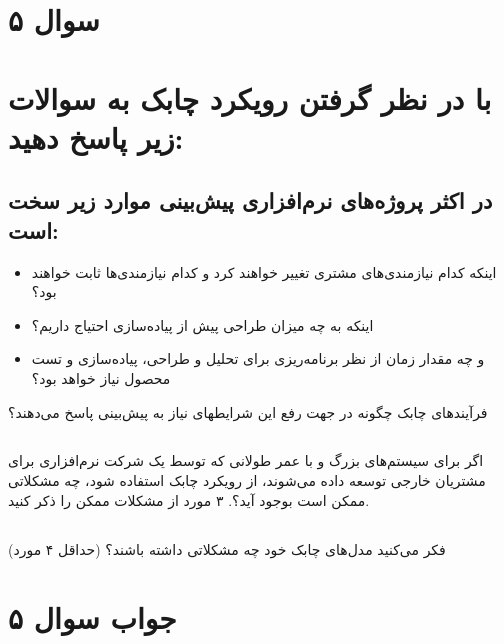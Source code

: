 \section*{سوال ۵}

\section*{با در نظر گرفتن رویکرد چابک به سوالات زیر پاسخ دهید:}
\subsection*{ در اکثر پروژه‌های نرم‌افزاری پیش‌بینی موارد زیر سخت است:}
\begin{itemize}
	\item اینکه کدام نیازمندی‌های مشتری تغییر خواهند کرد و کدام نیازمندی‌ها ثابت خواهند بود؟
	\item اینکه به چه میزان طراحی پیش از پیاده‌سازی احتیاج داریم؟
	\item و چه مقدار زمان از نظر برنامه‌ریزی برای تحلیل و طراحی، پیاده‌سازی و تست محصول نیاز خواهد بود؟
\end{itemize}
فرآیندهای چابک چگونه در جهت رفع این شرایطهای نیاز به پیش‌بینی پاسخ می‌دهند؟

\subsection*{}
 اگر برای سیستم‌های بزرگ و با عمر طولانی که توسط یک شرکت نرم‌افزاری برای مشتریان خارجی توسعه داده می‌شوند، از رویکرد چابک استفاده شود، چه مشکلاتی ممکن است بوجود آید؟. ۳ مورد از مشکلات ممکن را ذکر کنید.

\subsection*{}
 فکر می‌کنید مدل‌های چابک خود چه مشکلاتی داشته باشند؟ (حداقل ۴ مورد)

\section*{جواب سوال ۵}

